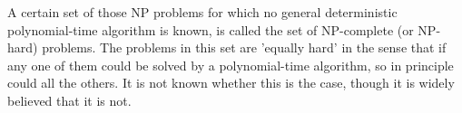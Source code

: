 A certain set of those NP problems for which no general 
deterministic polynomial-time
algorithm is known, is called the set of NP-complete (or 
NP-hard) problems. The problems in this
set are 'equally hard' in the sense that 
if any one of them could be solved by a polynomial-time
algorithm, so in principle could all the others. 
It is not known whether this is the case, though
it is widely believed that it is not.

